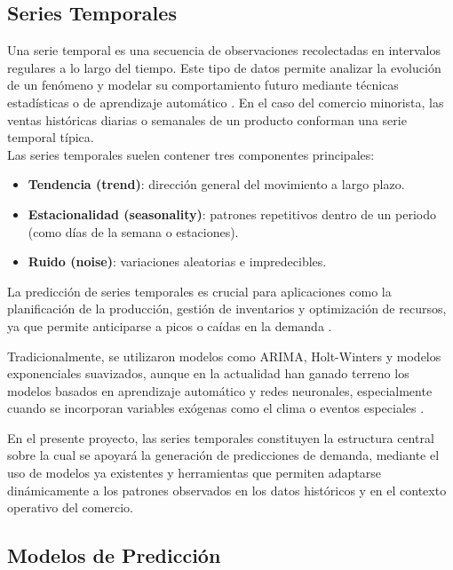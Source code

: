 \subsection{Series Temporales}

Una serie temporal es una secuencia de observaciones recolectadas en intervalos regulares a lo largo del tiempo. Este tipo de datos permite analizar la evolución de un fenómeno y modelar su comportamiento futuro mediante técnicas estadísticas o de aprendizaje automático \parencite{chatfield2004}. En el caso del comercio minorista, las ventas históricas diarias o semanales de un producto conforman una serie temporal típica.\\

Las series temporales suelen contener tres componentes principales:

\begin{itemize}
    \item \textbf{Tendencia (trend)}: dirección general del movimiento a largo plazo.
    
    \item \textbf{Estacionalidad (seasonality)}: patrones repetitivos dentro de un periodo (como días de la semana o estaciones).
    
    \item \textbf{Ruido (noise)}: variaciones aleatorias e impredecibles.
\end{itemize}

La predicción de series temporales es crucial para aplicaciones como la planificación de la producción, gestión de inventarios y optimización de recursos, ya que permite anticiparse a picos o caídas en la demanda \parencite{hyndman2018}.

Tradicionalmente, se utilizaron modelos como ARIMA, Holt-Winters y modelos exponenciales suavizados, aunque en la actualidad han ganado terreno los modelos basados en aprendizaje automático y redes neuronales, especialmente cuando se incorporan variables exógenas como el clima o eventos especiales \parencite{bandara2020}.

En el presente proyecto, las series temporales constituyen la estructura central sobre la cual se apoyará la generación de predicciones de demanda, mediante el uso de modelos ya existentes y herramientas que permiten adaptarse dinámicamente a los patrones observados en los datos históricos y en el contexto operativo del comercio.

\subsection{Modelos de Predicción}

